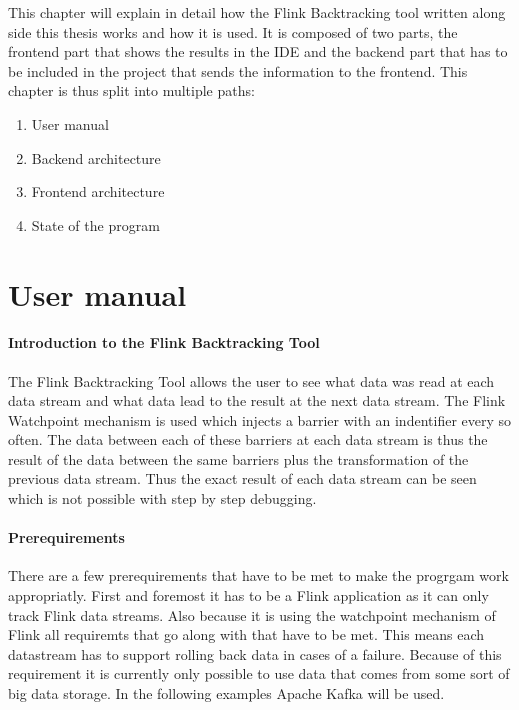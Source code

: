 This chapter will explain in detail how the Flink Backtracking tool written along side this thesis works and how it is used. It is composed of two parts, the frontend part that shows the results in the IDE and the backend part that has to be included in the project that sends the information to the frontend. This chapter is thus split into multiple paths:
\begin{enumerate}
  \item[\ref{fbManual}] User manual
  \item[\ref{fbBackend}] Backend architecture
  \item[\ref{fbFrontend}] Frontend architecture
  \item[\ref{fbState}] State of the program
\end{enumerate}

\section{User manual}
\label{fbManual}

\paragraph{Introduction to the Flink Backtracking Tool}
The Flink Backtracking Tool allows the user to see what data was read at each data stream and what data lead to the result at the next data stream. The Flink Watchpoint mechanism is used which injects a barrier with an indentifier every so often. The data between each of these barriers at each data stream is thus the result of the data between the same barriers plus the transformation of the previous data stream. Thus the exact result of each data stream can be seen which is not possible with step by step debugging.

\paragraph{Prerequirements} There are a few prerequirements that have to be met to make the progrgam work appropriatly. First and foremost it has to be a Flink application as it can only track Flink data streams. Also because it is using the watchpoint mechanism of Flink all requiremts that go along with that have to be met. This means each datastream has to support rolling back data in cases of a failure. Because of this requirement it is currently only possible to use data that comes from some sort of big data storage. In the following examples Apache Kafka will be used.

